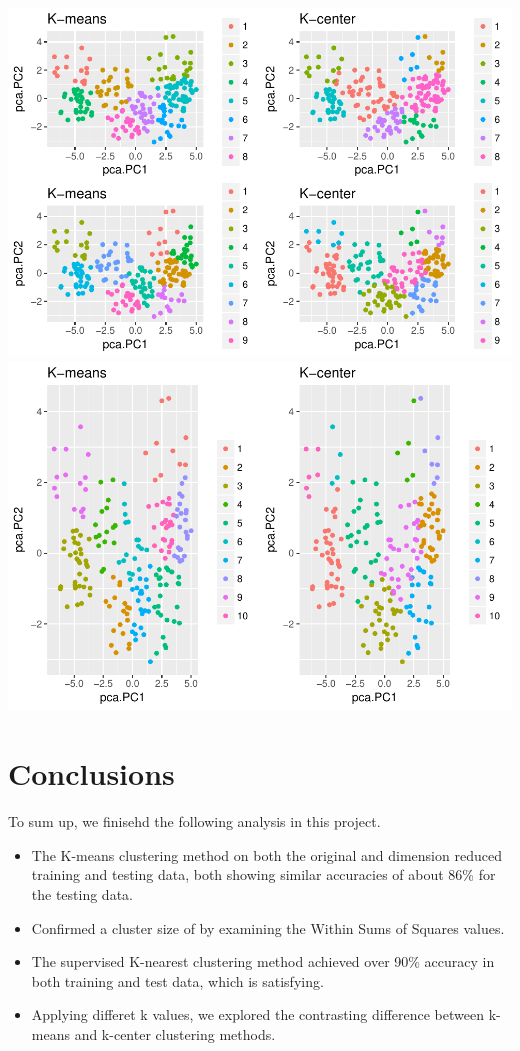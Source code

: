 \documentclass[]{article}
\begin{document}
\includegraphics{Project2_files/figure-latex/unnamed-chunk-5-4.pdf}
\includegraphics{Project2_files/figure-latex/unnamed-chunk-5-5.pdf}

\section{Conclusions}\label{conclusions}

To sum up, we finisehd the following analysis in this project.

\begin{itemize}
\item
  The K-means clustering method on both the original and dimension
  reduced training and testing data, both showing similar accuracies of
  about 86\% for the testing data.
\item
  Confirmed a cluster size of by examining the Within Sums of Squares
  values.
\item
  The supervised K-nearest clustering method achieved over 90\% accuracy
  in both training and test data, which is satisfying.
\item
  Applying differet k values, we explored the contrasting difference
  between k-means and k-center clustering methods.
\end{itemize}
\end{document}
